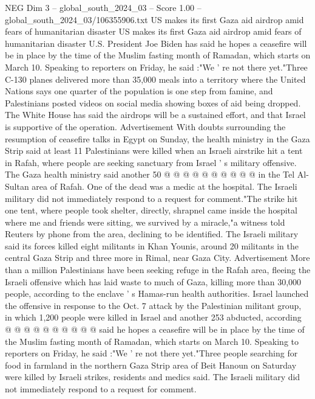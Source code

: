 \begin{textsample}{NEG Dim 3 – global\_south\_2024\_03 – Score 1.00 – global\_south\_2024\_03/106355906.txt}  \label{ex:f3_neg_034}
US makes its first Gaza aid airdrop amid fears of humanitarian disaster US makes its first Gaza aid airdrop amid fears of humanitarian disaster U.S.
President Joe Biden has said he hopes a ceasefire will be in place by the time of the Muslim fasting month of Ramadan, which starts on March 10.
Speaking to reporters on Friday, he said :"We ' re not there yet."Three C-130 planes delivered more than 35,000 meals into a territory where the United Nations says one quarter of the population is one step from famine, and Palestinians posted videos on social media showing boxes of aid being dropped.
The White House has said the airdrops will be a sustained effort, and that Israel is supportive of the operation.
Advertisement With doubts surrounding the resumption of ceasefire talks in Egypt on Sunday, the health ministry in the Gaza Strip said at least 11 Palestinians were killed when an Israeli airstrike hit a tent in Rafah, where people are seeking sanctuary from Israel ' s military offensive.
The Gaza health ministry said another 50 @ @ @ @ @ @ @ @ @ @ in the Tel Al-Sultan area of Rafah.
One of the dead was a medic at the hospital.
The Israeli military did not immediately respond to a request for comment."The strike hit one tent, where people took shelter, directly, shrapnel came inside the hospital where me and friends were sitting, we survived by a miracle,"a witness told Reuters by phone from the area, declining to be identified.
The Israeli military said its forces killed eight militants in Khan Younis, around 20 militants in the central Gaza Strip and three more in Rimal, near Gaza City.
Advertisement More than a million Palestinians have been seeking refuge in the Rafah area, fleeing the Israeli offensive which has laid waste to much of Gaza, killing more than 30,000 people, according to the enclave ' s Hamas-run health authorities.
Israel launched the offensive in response to the Oct. 7 attack by the Palestinian militant group, in which 1,200 people were killed in Israel and another 253 abducted, according @ @ @ @ @ @ @ @ @ @ said he hopes a ceasefire will be in place by the time of the Muslim fasting month of Ramadan, which starts on March 10.
Speaking to reporters on Friday, he said :"We ' re not there yet."Three people searching for food in farmland in the northern Gaza Strip area of Beit Hanoun on Saturday were killed by Israeli strikes, residents and medics said.
The Israeli military did not immediately respond to a request for comment.

\end{textsample}
